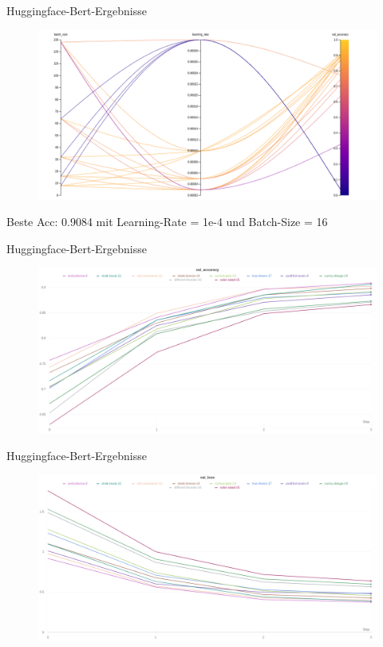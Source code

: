 \documentclass[xcolor=table]{beamer}
\begin{document}
\begin{frame}[t]{Huggingface-Bert-Ergebnisse}\vspace{10pt}
	\begin{figure}
		\includegraphics[scale=.25]{hf_overview.png}
	\end{figure}
	Beste Acc: 0.9084 mit Learning-Rate = 1e-4 und Batch-Size = 16
\end{frame}

\begin{frame}[t]{Huggingface-Bert-Ergebnisse}\vspace{10pt}
	\begin{figure}
		\includegraphics[scale=.25]{hf_acc.png}
	\end{figure}
\end{frame}

\begin{frame}[t]{Huggingface-Bert-Ergebnisse}\vspace{10pt}
	\begin{figure}
		\includegraphics[scale=.25]{hf_loss.png}
	\end{figure}
\end{frame}
\end{document}
